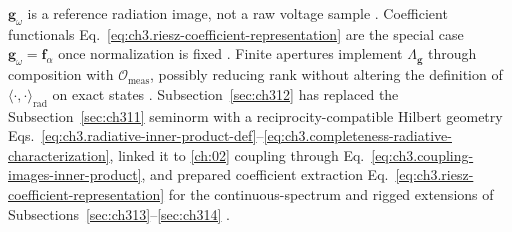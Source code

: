 \(\mathbf{g}_\omega\) is a reference radiation image, not a raw voltage sample \cite{harrington2001}. Coefficient
functionals Eq.~\eqref{eq:ch3.riesz-coefficient-representation} are the special case
\(\mathbf{g}_\omega=\mathbf{f}_\alpha\) once normalization is fixed \cite{stratton1941}. Finite
apertures implement \(\Lambda_{\mathbf{g}}\) through composition with \(\mathcal{O}_{\mathrm{meas}}\), possibly
reducing rank without altering the definition of \(\langle\cdot,\cdot\rangle_{\mathrm{rad}}\) on exact states
\cite{harrington2001}.
Subsection~\ref{sec:ch312} has replaced the Subsection~\ref{sec:ch311} seminorm with a reciprocity-compatible
Hilbert geometry Eqs.~\eqref{eq:ch3.radiative-inner-product-def}--\eqref{eq:ch3.completeness-radiative-characterization},
linked it to \ref{ch:02} coupling through Eq.~\eqref{eq:ch3.coupling-images-inner-product}, and
prepared coefficient extraction Eq.~\eqref{eq:ch3.riesz-coefficient-representation} for the continuous-spectrum
and rigged extensions of Subsections~\ref{sec:ch313}--\ref{sec:ch314} \cite{stratton1941}.

